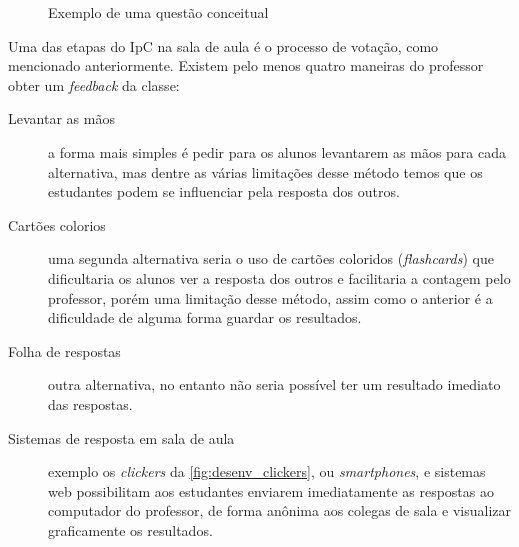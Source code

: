 \begin{figure}[!htb]
  \centering
  \caption{Exemplo de uma questão conceitual}
\end{figure}

Uma das etapas do IpC na sala de aula é o processo de votação, como mencionado
anteriormente. Existem pelo menos quatro maneiras \cite{Crouch2007} do professor
obter um \textit{feedback} da classe:

\begin{description}
  \item[Levantar as mãos] a forma mais simples é pedir para os alunos levantarem as mãos para cada alternativa,
  mas dentre as várias limitações desse método temos que os estudantes podem se
  influenciar pela resposta dos outros.
  \item[Cartões colorios] uma segunda alternativa seria o uso de
  cartões coloridos (\textit{flashcards}) que dificultaria os alunos ver a resposta
  dos outros e facilitaria a contagem pelo professor, porém uma limitação desse método,
  assim como o anterior é a dificuldade de alguma forma guardar os resultados.
  \item[Folha de respostas] outra alternativa, no entanto não seria possível ter
  um resultado imediato das respostas.
  \item[Sistemas de resposta em sala de aula] exemplo os \textit{clickers} da \autoref{fig:desenv_clickers}, ou \textit{smartphones},
  e sistemas web possibilitam aos estudantes enviarem imediatamente as respostas ao
  computador do professor, de forma anônima aos colegas de sala e visualizar graficamente
  os resultados.
\end{description}

